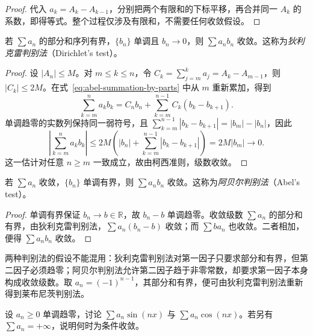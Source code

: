 \documentclass[UTF8,12pt,a4paper,fontset=fandol]{ctexbook}
\begin{document}
\begin{proof}
代入 $a_k=A_k-A_{k-1}$，分别把两个有限和的下标平移，再合并同一 $A_k$ 的系数，即得等式。整个过程仅涉及有限和，不需要任何收敛假设。
\end{proof}

\begin{theorem}[狄利克雷判别法]
\label{thm:dirichlet-test-for-series}
若 $\sum a_n$ 的部分和序列有界，$\{b_n\}$ 单调且 $b_n\to0$，则 $\sum a_nb_n$ 收敛。这称为\emph{狄利克雷判别法}（Dirichlet's test）。
\end{theorem}

\begin{proof}
设 $|A_n|\leq M$。对 $m\leq k\leq n$，令 $C_k=\sum_{j=m}^k a_j=A_k-A_{m-1}$，则 $|C_k|\leq2M$。在式~\eqref{eq:abel-summation-by-parts} 中从 $m$ 重新累加，得到
\[
    \sum_{k=m}^n a_kb_k=C_nb_n+\sum_{k=m}^{n-1}C_k(b_k-b_{k+1}).
\]
单调趋零的实数列保持同一弱符号，且
$\sum_{k=m}^{n-1}|b_k-b_{k+1}|=|b_m|-|b_n|$，因此
\[
    \left|\sum_{k=m}^n a_kb_k\right|
      \leq2M\left(|b_n|+\sum_{k=m}^{n-1}|b_k-b_{k+1}|\right)
      =2M|b_m|\longrightarrow0.
\]
这一估计对任意 $n\geq m$ 一致成立，故由柯西准则，级数收敛。
\end{proof}

\begin{theorem}[阿贝尔判别法]
\label{thm:abel-test-for-series}
若 $\sum a_n$ 收敛，$\{b_n\}$ 单调有界，则 $\sum a_nb_n$ 收敛。这称为\emph{阿贝尔判别法}（Abel's test）。
\end{theorem}

\begin{proof}
单调有界保证 $b_n\to b\in\mathbb R$，故 $b_n-b$ 单调趋零。收敛级数 $\sum a_n$ 的部分和有界，由狄利克雷判别法，$\sum a_n(b_n-b)$ 收敛；而 $\sum ba_n$ 也收敛。二者相加，便得 $\sum a_nb_n$ 收敛。
\end{proof}

两种判别法的假设不能混用：狄利克雷判别法对第一因子只要求部分和有界，但第二因子必须趋零；阿贝尔判别法允许第二因子趋于非零常数，却要求第一因子本身构成收敛级数。取 $a_n=(-1)^{n-1}$，其部分和有界，便可由狄利克雷判别法重新得到莱布尼茨判别法。

\begin{example}
\label{ex:dirichlet-trigonometric-series}
设 $a_n\geq0$ 单调趋零，讨论 $\sum a_n\sin(nx)$ 与 $\sum a_n\cos(nx)$。若另有 $\sum a_n=+\infty$，说明何时为条件收敛。
\end{example}
\end{document}
